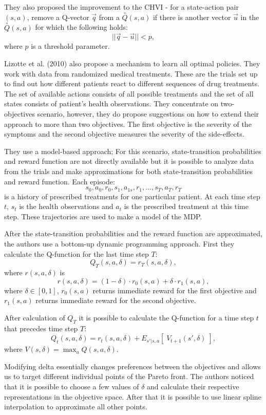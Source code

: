 They also proposed the improvement to the CHVI - for a state-action pair $(s,a)$, remove a Q-vector $\vec{q}$ from a $\overset{\circ}{Q}(s,a)$ if there is another vector $\vec{u}$ in the $\overset{\circ}{Q}(s,a)$ for which the following holds:
$$ || \vec{q} - \vec{u} || < p, $$
where $p$ is a threshold parameter.

Lizotte et al. (2010) \nocite{lizotte2010efficient} also propose a mechanism to learn all optimal policies. They work with data from randomized medical treatments. These are the trials set up to find out how different patients react to different sequences of drug treatments. The set of available actions consists of all possible treatments and the set of all states consists of patient's health observations. They concentrate on two-objectives scenario, however, they do propose suggestions on how to extend their approach to more than two objectives. The first objective is the severity of the symptoms and the second objective measures the severity of the side-effects.

They use a model-based approach; For this scenario, state-transition probabilities and reward function are not directly available but it is possible to analyze data from the trials and make approximations for both state-transition probabilities and reward function. Each episode:
$$ s_{0},a_{0},r_{0},s_{1},a_{1s},r_{1}, ... , s_{T},a_{T},r_{T} $$
is a history of prescribed treatments for one particular patient. At each time step $t$, $s_{t}$ is the health observations and $a_{t}$ is the prescribed treatment at this time step. These trajectories are used to make a model of the MDP.

After the state-transition probabilities and the reward function are approximated, the authors use a bottom-up dynamic programming approach. First they calculate the Q-function for the last time step $T$:
$$ Q_{T}(s,a,\delta) = r_{T}(s,a,\delta), $$
where $r(s,a,\delta)$ is
$$ r(s,a,\delta) = (1 - \delta) \cdot r_{0}(s,a) + \delta \cdot r_{1}(s,a), $$
where $ \delta \in [0,1] $, $ r_{0}(s,a) $ returns immediate reward for the first objective and $ r_{1}(s,a) $ returns immediate reward for the second objective.

After calculation of $ Q_{T} $ it is possible to calculate the Q-function for a time step $ t $ that precedes time step $ T $:
$$ Q_{t}(s,a,\delta) = r_{t}(s,a,\delta) + E_{s'|s,a} \left[\; V_{t+1}(s',\delta)\;\right], $$
where $ V(s,\delta) = \max_a Q(s,a,\delta). $

Modifying delta essentially changes preferences between the objectives and allows us to target different individual points of the Pareto front. The authors noticed that it is possible to choose a few values of $ \delta $ and calculate their respective representations in the objective space. After that it is possible to use linear spline interpolation to approximate all other points.

